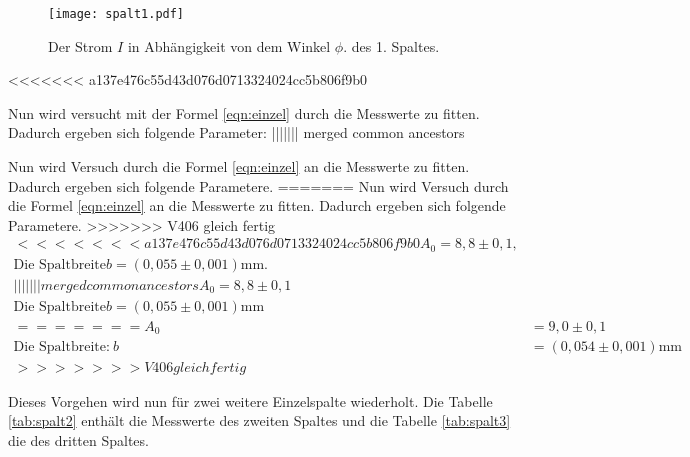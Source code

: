 \begin{figure}
  \centering
  \texttt{[image: spalt1.pdf]}
  \caption{ Der Strom $I$ in Abhängigkeit von dem Winkel $\phi$. des 1. Spaltes.}
  \label{fig:spalt1}
\end{figure}
<<<<<<< a137e476c55d43d076d0713324024cc5b806f9b0

Nun wird versucht mit der Formel \eqref{eqn:einzel} durch die Messwerte zu fitten.
Dadurch ergeben sich folgende Parameter:
||||||| merged common ancestors

Nun wird Versuch durch die Formel \eqref{eqn:einzel} an die Messwerte zu fitten.
Dadurch ergeben sich folgende Parametere.
=======
\FloatBarrier
Nun wird Versuch durch die Formel \eqref{eqn:einzel} an die Messwerte zu fitten.
Dadurch ergeben sich folgende Parametere.
>>>>>>> V406 gleich fertig
\begin{align*}
<<<<<<< a137e476c55d43d076d0713324024cc5b806f9b0
  A_0=8,8\pm0,1,\\
  \text{Die Spaltbreite} b=(0,055\pm0,001)\si{\milli\meter}.\\
||||||| merged common ancestors
  A_0=8,8\pm0,1\\
  \text{Die Spaltbreite} b=(0,055\pm0,001)\si{\milli\meter}\\
=======
  A_0&=9,0\pm0,1\\
  \text{Die Spaltbreite:} \ b&=(0,054\pm0,001)\si{\milli\meter}\\
>>>>>>> V406 gleich fertig
\end{align*}

Dieses Vorgehen wird nun für zwei weitere Einzelspalte wiederholt.
Die Tabelle \ref{tab:spalt2} enthält die Messwerte des zweiten Spaltes
und die Tabelle \ref{tab:spalt3} die des dritten Spaltes.





